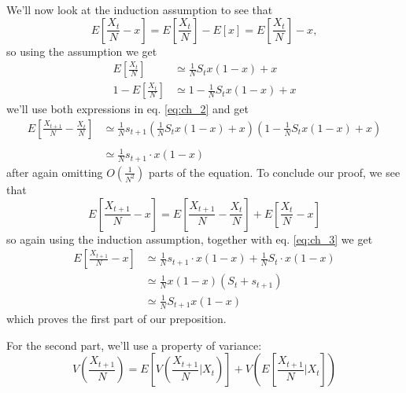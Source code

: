 \documentclass[11pt]{article}
\begin{document}
We'll now look at the induction assumption to see that
\begin{equation}
E\left[\frac{X_t}{N}-x\right]=E\left[\frac{X_t}{N}\right]-E[x]=E\left[\frac{X_t}{N}\right]-x ,
\end{equation}
so using the assumption we get
\begin{equation}
\begin{split}
E\left[\frac{X_t}{N}\right] &\simeq \frac{1}{N} S_t x(1-x)+x \\
1 - E\left[\frac{X_t}{N}\right] &\simeq 1- \frac{1}{N} S_t x(1-x)+x
\end{split}
\end{equation}
we'll use both expressions in eq. \ref{eq:ch_2} and get
\begin{equation}\label{eq:ch_3}
\begin{split}
E\left[\frac{X_{t+1}}{N}-\frac{X_t}{N}\right] &\simeq \frac{1}{N}s_{t+1} \left(\frac{1}{N} S_t x(1-x)+x \right)\left(1- \frac{1}{N} S_t x(1-x)+x \right) \\\\
&\simeq  \frac{1}{N}s_{t+1}\cdot x(1-x)
\end{split}
\end{equation}
after again omitting $O(\frac{1}{N^2})$ parts of the equation.
To conclude our proof, we see that
\begin{equation}
E\left[\frac{X_{t+1}}{N}-x\right] = E\left[\frac{X_{t+1}}{N}-\frac{X_t}{N}\right] + E\left[\frac{X_t}{N}-x\right]
\end{equation}
so again using the induction assumption, together with eq. \ref{eq:ch_3} we get
\begin{equation}
\begin{split}
E\left[\frac{X_{t+1}}{N}-x\right] &\simeq \frac{1}{N}s_{t+1}\cdot x(1-x) + \frac{1}{N}S_t\cdot x(1-x) \\
& \simeq \frac{1}{N}x(1-x)(S_t + s_{t+1}) \\
& \simeq \frac{1}{N} S_{t+1} x(1-x)
\end{split}
\end{equation}
which proves the first part of our preposition.

For the second part, we'll use a property of variance:
\begin{equation}\label{eq:ch_var}
V\left(\frac{X_{t+1}}{N}\right) = E\left[V\left(\frac{X_{t+1}}{N} \bigg|X_t \right)\right] + V\left(E\left[\frac{X_{t+1}}{N} \bigg|X_t \right]\right)
\end{equation}
\end{document}
